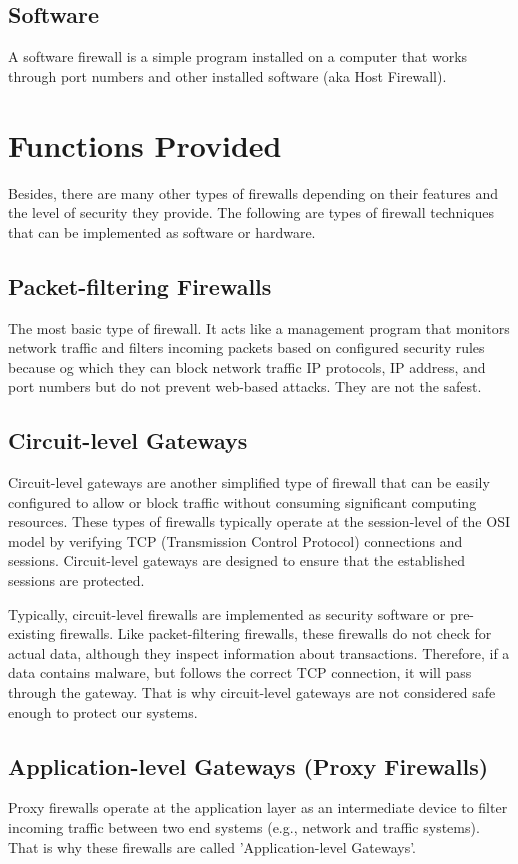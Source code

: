 \documentclass[a4paper,12pt]{book}
\begin{document}
\subsection{Software}
A software firewall is a simple program installed on a computer that works through port numbers and other installed software (aka Host Firewall).

\section{Functions Provided}
Besides, there are many other types of firewalls depending on their features and the level of security they provide. The following are types of firewall techniques that can be implemented as software or hardware.
\subsection{Packet-filtering Firewalls}
The most basic type of firewall. It acts like a management program that monitors network traffic and filters incoming packets based on configured security rules because og which they can block network traffic IP protocols, IP address, and port numbers but do not prevent web-based attacks. They are not the safest.

\subsection{Circuit-level Gateways}
Circuit-level gateways are another simplified type of firewall that can be easily configured to allow or block traffic without consuming significant computing resources. These types of firewalls typically operate at the session-level of the OSI model by verifying TCP (Transmission Control Protocol) connections and sessions. Circuit-level gateways are designed to ensure that the established sessions are protected.

Typically, circuit-level firewalls are implemented as security software or pre-existing firewalls. Like packet-filtering firewalls, these firewalls do not check for actual data, although they inspect information about transactions. Therefore, if a data contains malware, but follows the correct TCP connection, it will pass through the gateway. That is why circuit-level gateways are not considered safe enough to protect our systems.
\subsection{Application-level Gateways (Proxy Firewalls)}
Proxy firewalls operate at the application layer as an intermediate device to filter incoming traffic between two end systems (e.g., network and traffic systems). That is why these firewalls are called 'Application-level Gateways'.
\end{document}

